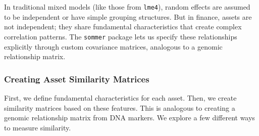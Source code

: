 \documentclass[
]{article}
\begin{document}
In traditional mixed models (like those from \texttt{lme4}), random
effects are assumed to be independent or have simple grouping
structures. But in finance, assets are not independent; they share
fundamental characteristics that create complex correlation patterns.
The \texttt{sommer} package lets us specify these relationships
explicitly through custom covariance matrices, analogous to a genomic
relationship matrix.

\subsubsection{Creating Asset Similarity
Matrices}\label{creating-asset-similarity-matrices}

First, we define fundamental characteristics for each asset. Then, we
create similarity matrices based on these features. This is analogous to
creating a genomic relationship matrix from DNA markers. We explore a
few different ways to measure similarity.
\end{document}
